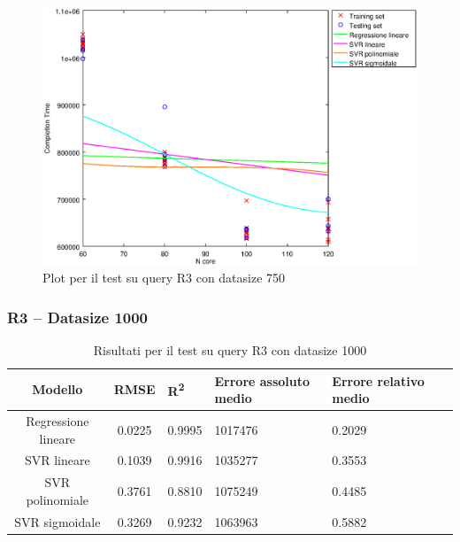 \documentclass[a4paper,11pt]{article}
\begin{document}
\begin {figure}[hbtp]
\centering
\includegraphics[width=\textwidth]{output/R3_750/plot_R3_750.eps}
\caption {Plot per il test su query R3 con datasize 750}
\end {figure}
\newpage
\subsubsection{R3 -- Datasize 1000}
\begin{table}[bhpt]
	\centering
	\begin{adjustbox}{center}
		\begin{tabular}{c | c M{1cm} M{2.5cm} M{2.5cm} M{1.8cm}}
			Modello & RMSE & R\textsuperscript{2} & Errore assoluto medio & Errore relativo medio \tabularnewline
			\hline
			Regressione lineare & 0.0225 & 0.9995 & 1017476 & 0.2029 \\
			SVR lineare & 0.1039 & 0.9916 & 1035277 & 0.3553 \\
			SVR polinomiale & 0.3761 & 0.8810 & 1075249 & 0.4485 \\
			SVR sigmoidale & 0.3269 & 0.9232 & 1063963 & 0.5882 \\
		\end{tabular}
	\end{adjustbox}
	\\
	\caption{Risultati per il test su query R3 con datasize 1000}
	\label{table_R3_1000}
\end{table}
\end{document}
